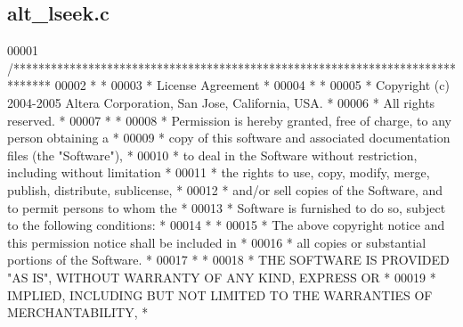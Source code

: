 \subsection{alt\+\_\+lseek.\+c}
\label{alt__lseek_8c_source}

\begin{DoxyCode}
00001 \textcolor{comment}{/******************************************************************************}
00002 \textcolor{comment}{*                                                                             *}
00003 \textcolor{comment}{* License Agreement                                                           *}
00004 \textcolor{comment}{*                                                                             *}
00005 \textcolor{comment}{* Copyright (c) 2004-2005 Altera Corporation, San Jose, California, USA.      *}
00006 \textcolor{comment}{* All rights reserved.                                                        *}
00007 \textcolor{comment}{*                                                                             *}
00008 \textcolor{comment}{* Permission is hereby granted, free of charge, to any person obtaining a     *}
00009 \textcolor{comment}{* copy of this software and associated documentation files (the "Software"),  *}
00010 \textcolor{comment}{* to deal in the Software without restriction, including without limitation   *}
00011 \textcolor{comment}{* the rights to use, copy, modify, merge, publish, distribute, sublicense,    *}
00012 \textcolor{comment}{* and/or sell copies of the Software, and to permit persons to whom the       *}
00013 \textcolor{comment}{* Software is furnished to do so, subject to the following conditions:        *}
00014 \textcolor{comment}{*                                                                             *}
00015 \textcolor{comment}{* The above copyright notice and this permission notice shall be included in  *}
00016 \textcolor{comment}{* all copies or substantial portions of the Software.                         *}
00017 \textcolor{comment}{*                                                                             *}
00018 \textcolor{comment}{* THE SOFTWARE IS PROVIDED "AS IS", WITHOUT WARRANTY OF ANY KIND, EXPRESS OR  *}
00019 \textcolor{comment}{* IMPLIED, INCLUDING BUT NOT LIMITED TO THE WARRANTIES OF MERCHANTABILITY,    *}

\end{DoxyCode}
